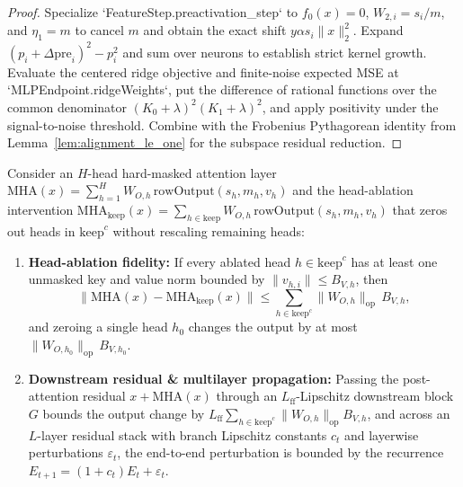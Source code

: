 \begin{proof}
\leanok
Specialize `FeatureStep.preactivation_step` to $f_0(x)=0$, $W_{2,i}=s_i/m$, and $\eta_1=m$ to cancel $m$ and obtain the exact shift $y\alpha s_i\|x\|_2^2$. Expand $(p_i + \Delta\mathrm{pre}_i)^2 - p_i^2$ and sum over neurons to establish strict kernel growth. Evaluate the centered ridge objective and finite-noise expected MSE at `MLPEndpoint.ridgeWeights`, put the difference of rational functions over the common denominator $(K_0+\lambda)^2(K_1+\lambda)^2$, and apply positivity under the signal-to-noise threshold. Combine with the Frobenius Pythagorean identity from Lemma~\ref{lem:alignment_le_one} for the subspace residual reduction.
\end{proof}

\begin{lemma}\label{lem:attention_ablation}
\leanok
{}
Consider an $H$-head hard-masked attention layer $\mathrm{MHA}(x) = \sum_{h=1}^H W_{O,h}\,\mathrm{rowOutput}(s_h, m_h, v_h)$ and the head-ablation intervention $\mathrm{MHA}_{\mathrm{keep}}(x) = \sum_{h\in\mathrm{keep}} W_{O,h}\,\mathrm{rowOutput}(s_h, m_h, v_h)$ that zeros out heads in $\mathrm{keep}^c$ without rescaling remaining heads:
\begin{enumerate}
\item \textbf{Head-ablation fidelity:} If every ablated head $h\in\mathrm{keep}^c$ has at least one unmasked key and value norm bounded by $\|v_{h,i}\|\le B_{V,h}$, then
\[
\bigl\|\mathrm{MHA}(x) - \mathrm{MHA}_{\mathrm{keep}}(x)\bigr\| \le \sum_{h\in\mathrm{keep}^c} \|W_{O,h}\|_{\mathrm{op}}\,B_{V,h},
\]
and zeroing a single head $h_0$ changes the output by at most $\|W_{O,h_0}\|_{\mathrm{op}}\,B_{V,h_0}$.
\item \textbf{Downstream residual & multilayer propagation:} Passing the post-attention residual $x + \mathrm{MHA}(x)$ through an $L_{\mathrm{ff}}$-Lipschitz downstream block $G$ bounds the output change by $L_{\mathrm{ff}}\sum_{h\in\mathrm{keep}^c}\|W_{O,h}\|_{\mathrm{op}}B_{V,h}$, and across an $L$-layer residual stack with branch Lipschitz constants $c_t$ and layerwise perturbations $\varepsilon_t$, the end-to-end perturbation is bounded by the recurrence $E_{t+1} = (1+c_t)E_t + \varepsilon_t$.

\end{enumerate}
\end{lemma}
